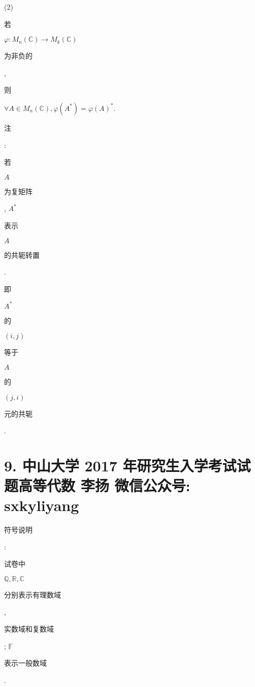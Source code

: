 \documentclass[10pt]{article}
\begin{document}
(2) \begin{CJK}{UTF8}{mj}若\end{CJK} $\varphi: M_{n}(\mathbb{C}) \rightarrow M_{k}(\mathbb{C})$ \begin{CJK}{UTF8}{mj}为非负的\end{CJK}, \begin{CJK}{UTF8}{mj}则\end{CJK} $\forall A \in M_{n}(\mathbb{C}), \varphi\left(A^{*}\right)=\varphi(A)^{*}$.

\begin{CJK}{UTF8}{mj}注\end{CJK}: \begin{CJK}{UTF8}{mj}若\end{CJK} $A$ \begin{CJK}{UTF8}{mj}为复矩阵\end{CJK}, $A^{*}$ \begin{CJK}{UTF8}{mj}表示\end{CJK} $A$ \begin{CJK}{UTF8}{mj}的共轭转置\end{CJK}. \begin{CJK}{UTF8}{mj}即\end{CJK} $A^{*}$ \begin{CJK}{UTF8}{mj}的\end{CJK} $(i, j)$ \begin{CJK}{UTF8}{mj}等于\end{CJK} $A$ \begin{CJK}{UTF8}{mj}的\end{CJK} $(j, i)$ \begin{CJK}{UTF8}{mj}元的共轭\end{CJK}.

\section{9. 中山大学 2017 年研究生入学考试试题高等代数 
 李扬 
 微信公众号: sxkyliyang}
\begin{CJK}{UTF8}{mj}符号说明\end{CJK}: \begin{CJK}{UTF8}{mj}试卷中\end{CJK} $\mathbb{Q}, \mathbb{R}, \mathbb{C}$ \begin{CJK}{UTF8}{mj}分别表示有理数域\end{CJK}, \begin{CJK}{UTF8}{mj}实数域和复数域\end{CJK}; $\mathbb{F}$ \begin{CJK}{UTF8}{mj}表示一般数域\end{CJK}.
\end{document}
